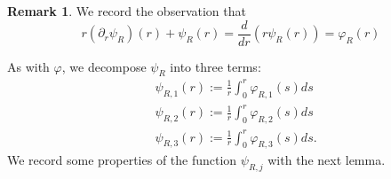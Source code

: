 \documentclass[reqno,11pt]{amsart}
\theoremstyle{plain}
\theoremstyle{definition}
\newtheorem{remark}[theorem]{Remark}
\numberwithin{equation}{section}
\numberwithin{theorem}{section}
\begin{document}
\begin{remark}We record the observation that
\begin{equation}\label{equ:idenpsi}
r\left(\partial_{r} \psi_{R}\right)(r)+\psi_{R}(r)=\frac{d}{d r}\left(r \psi_{R}(r)\right)=\varphi_{R}\left(r\right) 
\end{equation}
\end{remark}
As with $\varphi$, we decompose $\psi_{R}$ into three terms:
\begin{align}
 & \psi_{R, 1}(r):=\frac{1}{r} \int_{0}^{r} \varphi_{R, 1}\left( s\right) d s \label{psi1}\\
&\psi_{R,  2}(r) :=\frac{1}{r} \int_{0}^{r} \varphi_{R, 2}\left( s\right) d s\label{psi2}\\
& \psi_{R,  3}(r)
:=\frac{1}{r} \int_{0}^{r} \varphi_{R, 3}\left( s\right) d s.\label{psi3}  
\end{align}
We record some properties of the function $\psi_{R, j}$ with the next lemma.
\end{document}
